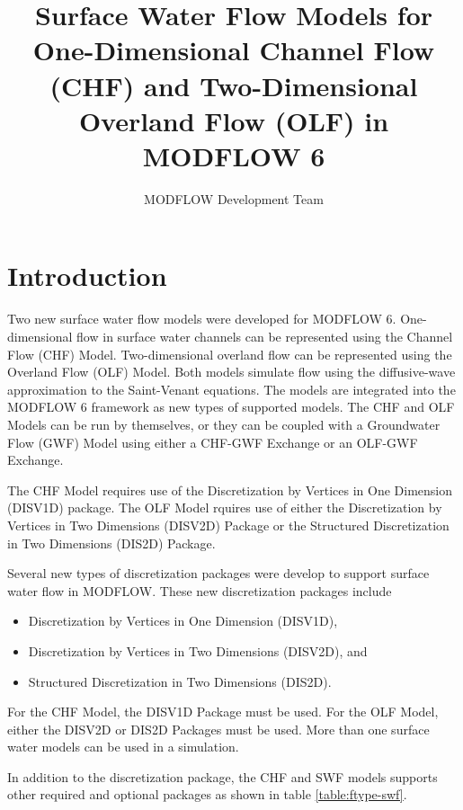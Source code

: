 \documentclass[fleqn]{article}
\author{MODFLOW Development Team}
\begin{document}
\title{Surface Water Flow Models for One-Dimensional Channel Flow (CHF) and Two-Dimensional Overland Flow (OLF) in MODFLOW 6}
\maketitle

\tableofcontents

\section{Introduction}
Two new surface water flow models were developed for MODFLOW 6.  One-dimensional flow in surface water channels can be represented using the Channel Flow (CHF) Model.  Two-dimensional overland flow can be represented using the Overland Flow (OLF) Model.  Both models simulate flow using the diffusive-wave approximation to the Saint-Venant equations.  The models are integrated into the MODFLOW 6 framework as new types of supported models. The CHF and OLF Models can be run by themselves, or they can be coupled with a Groundwater Flow (GWF) Model using either a CHF-GWF Exchange or an OLF-GWF Exchange.

The CHF Model requires use of the Discretization by Vertices in One Dimension (DISV1D) package.  The OLF Model rquires use of either the Discretization by Vertices in Two Dimensions (DISV2D) Package or the Structured Discretization in Two Dimensions (DIS2D) Package.

Several new types of discretization packages were develop to support surface water flow in MODFLOW.  These new discretization packages include 

\begin{itemize}
  \item Discretization by Vertices in One Dimension (DISV1D), 
  \item Discretization by Vertices in Two Dimensions (DISV2D), and
  \item Structured Discretization in Two Dimensions (DIS2D).
\end{itemize}

\noindent For the CHF Model, the DISV1D Package must be used.  For the OLF Model, either the DISV2D or DIS2D Packages must be used.  More than one surface water models can be used in a simulation.

In addition to the discretization package, the CHF and SWF models supports other required and optional packages as shown in table \ref{table:ftype-swf}.
\end{document}
